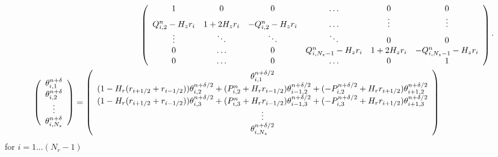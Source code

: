 \documentclass{article}
\begin{document}
\begin{eqnarray}
\left( \begin{array}{c c c c c c c}
1				&0					&0					&\hdots					&0			&0\\	
Q^{n}_{i,2} - H_z r_i	&1+2 H_z r_i				&-Q^{n}_{i,2} - H_z r_i 		& \hdots 					& \vdots		&\vdots\\
\vdots 			& \ddots 				& \ddots 				& \ddots 					& 0			&0\\		
0 				& \hdots 				&0	 				&Q^{n}_{i, N_z-1} - H_z r_{i} 		&1+2 H_z r_i 	& -Q^{n}_{i, N_z-1} - H_z r_{i} \\
0 				& \hdots 				&0	 				&\hdots					& 0			& 1  
\end{array} \right) \cdot \\
\left( \begin{array}{c}
\theta^{n+\delta}_{i,1}  \\
\theta^{n+\delta}_{i,2} \\
\vdots \\
\theta^{n+\delta}_{i,N_z} \end{array} \right)
=
\left( \begin{array}{c}
 \theta^{n+\delta/2}_{i,1} \\
(1- H_r (r_{i+1/2} + r_{i-1/2}) ) \theta^{n+\delta/2}_{i,2} +         (P^n_{i,2} + H_r r_{i-1/2} ) \theta^{n+\delta/2}_{i-1, 2} +           (-P^{n+\delta/2}_{i,2} +H_r r_{i+1/2} ) \theta^{n+\delta/2}_{i+1, 2}   \\
(1- H_r (r_{i+1/2} + r_{i-1/2}) ) \theta^{n+\delta/2}_{i,3} +         (P^n_{i,3} + H_r r_{i-1/2}) \theta^{n+\delta/2}_{i-1, 3} +           (-P^{n+\delta/2}_{i,3} + H_r r_{i+1/2} ) \theta^{n+\delta/2}_{i+1, 3}   \\
\vdots \\
\theta^{n+\delta/2}_{i,N_z} \end{array} \right) \hspace{15ex}
\end{eqnarray}
for $i= 1... (N_r - 1)$
\end{document}
